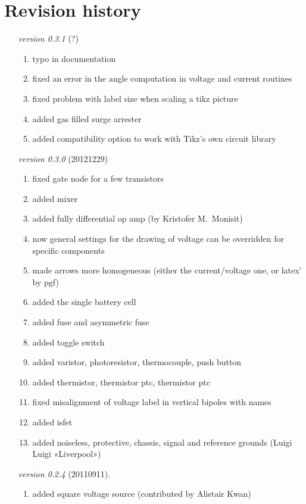 \documentclass[a4paper]{article}
\begin{document}
\section{Revision history}

\begin{itemize}
\item[\itshape version 0.3.1] (?)
	\begin{enumerate}
    	\item typo in documentation
	\item fixed an error in the angle computation in voltage and current routines
	\item fixed problem with label size when scaling a tikz picture
	\item added gas filled surge arrester
	\item added compatibility option to work with Tikz's own circuit library
    \end{enumerate}
\item[\itshape version 0.3.0] (20121229)
	\begin{enumerate}
	\item fixed gate node for a few transistors
    \item added mixer
    \item added fully differential op amp (by Kristofer M.~Monisit)
    \item now general settings for the drawing of voltage can be overridden for specific components
    \item made arrows more homogeneous (either the current/voltage one, or latex' by pgf)
    \item added the single battery cell
    \item added fuse and asymmetric fuse
    \item added toggle switch
    \item added varistor, photoresistor, thermocouple, push button
    \item added thermistor, thermistor ptc, thermistor ptc
    \item fixed misalignment of voltage label in vertical bipoles with names
    \item added isfet
    \item added noiseless, protective, chassis, signal and reference grounds (Luigi Luigi «Liverpool»)
    \end{enumerate}
\item[\itshape version 0.2.4]  (20110911).
	\begin{enumerate}
	\item added square voltage source (contributed by Alistair Kwan)

\end{enumerate}
\end{itemize}
\end{document}
